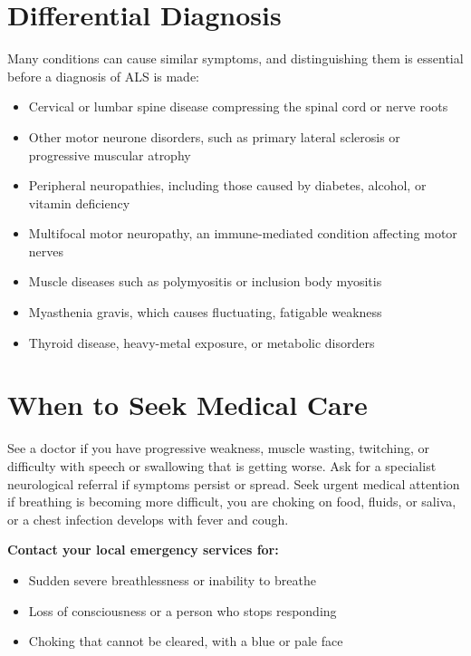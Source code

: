 \section*{Differential Diagnosis}
Many conditions can cause similar symptoms, and distinguishing them is essential before a diagnosis of ALS is made:
\begin{itemize}
    \item Cervical or lumbar spine disease compressing the spinal cord or nerve roots
    \item Other motor neurone disorders, such as primary lateral sclerosis or progressive muscular atrophy
    \item Peripheral neuropathies, including those caused by diabetes, alcohol, or vitamin deficiency
    \item Multifocal motor neuropathy, an immune-mediated condition affecting motor nerves
    \item Muscle diseases such as polymyositis or inclusion body myositis
    \item Myasthenia gravis, which causes fluctuating, fatigable weakness
    \item Thyroid disease, heavy-metal exposure, or metabolic disorders
\end{itemize}

\section*{When to Seek Medical Care}
See a doctor if you have progressive weakness, muscle wasting, twitching, or difficulty with speech or swallowing that is getting worse. Ask for a specialist neurological referral if symptoms persist or spread. Seek urgent medical attention if breathing is becoming more difficult, you are choking on food, fluids, or saliva, or a chest infection develops with fever and cough.

\textbf{Contact your local emergency services for:}
\begin{itemize}
    \item Sudden severe breathlessness or inability to breathe
    \item Loss of consciousness or a person who stops responding
    \item Choking that cannot be cleared, with a blue or pale face
\end{itemize}

